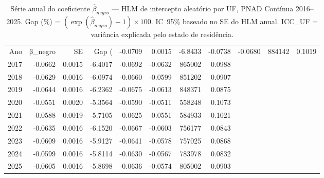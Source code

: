 \begin{table}
\caption{Série anual do coeficiente $\hat{\beta}_{negro}$ — HLM de intercepto aleatório por UF, PNAD Contínua 2016--2025. Gap (\%) = $(\exp(\hat{\beta}_{negro}) - 1) \times 100$. IC~95\% baseado no SE do HLM anual. ICC\_UF = variância explicada pelo estado de residência.}
\label{tab:tendencia_serie_anual}
\begin{tabular}{rrrrrrrr}
\toprule
Ano & β_negro & SE & Gap (%
 & -0.0709 & 0.0015 & -6.8433 & -0.0738 & -0.0680 & 884142 & 0.1019 \\
2017 & -0.0662 & 0.0015 & -6.4017 & -0.0692 & -0.0632 & 865002 & 0.0988 \\
2018 & -0.0629 & 0.0016 & -6.0974 & -0.0660 & -0.0599 & 851202 & 0.0907 \\
2019 & -0.0644 & 0.0016 & -6.2362 & -0.0675 & -0.0613 & 848371 & 0.0875 \\
2020 & -0.0551 & 0.0020 & -5.3564 & -0.0590 & -0.0511 & 558248 & 0.1073 \\
2021 & -0.0588 & 0.0019 & -5.7105 & -0.0625 & -0.0551 & 584933 & 0.1021 \\
2022 & -0.0635 & 0.0016 & -6.1520 & -0.0667 & -0.0603 & 756177 & 0.0843 \\
2023 & -0.0609 & 0.0016 & -5.9127 & -0.0641 & -0.0578 & 757025 & 0.0868 \\
2024 & -0.0599 & 0.0016 & -5.8114 & -0.0630 & -0.0567 & 783978 & 0.0832 \\
2025 & -0.0605 & 0.0016 & -5.8698 & -0.0636 & -0.0574 & 805002 & 0.0903 \\
\bottomrule
\end{tabular}
\end{table}

